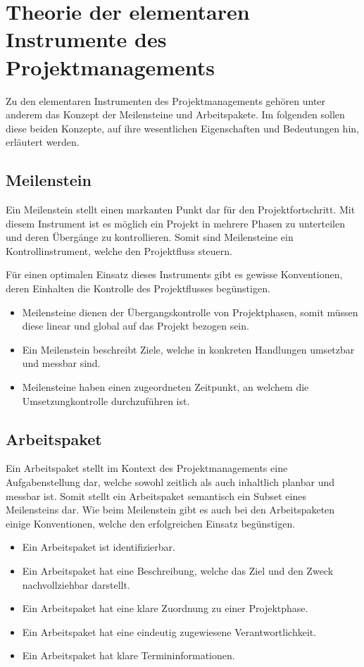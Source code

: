 \section{Theorie der elementaren Instrumente des Projektmanagements}
Zu den elementaren Instrumenten des Projektmanagements gehören unter
anderem das Konzept der Meilensteine und Arbeitspakete. Im folgenden
sollen diese beiden Konzepte, auf ihre wesentlichen Eigenschaften und
Bedeutungen hin, erläutert werden.

\subsection{Meilenstein}
Ein Meilenstein stellt einen markanten Punkt dar für den
Projektfortschritt. Mit diesem Instrument ist es möglich ein Projekt
in mehrere Phasen zu unterteilen und deren Übergänge zu kontrollieren.
Somit sind Meilensteine ein Kontrollinstrument, welche den
Projektfluss steuern.

Für einen optimalen Einsatz dieses Instruments gibt es gewisse
Konventionen, deren Einhalten die Kontrolle des Projektflusses
begünstigen.

\begin{itemize}
	\item Meilensteine dienen der Übergangskontrolle von
		Projektphasen, somit müssen diese linear und
		global auf das Projekt bezogen sein.
	\item Ein Meilenstein beschreibt Ziele, welche in konkreten
		Handlungen umsetzbar und messbar sind.
	\item Meilensteine haben einen zugeordneten Zeitpunkt, an
		welchem die Umsetzungkontrolle durchzuführen ist.
\end{itemize}

\subsection{Arbeitspaket}
Ein Arbeitspaket stellt im Kontext des Projektmanagements eine
Aufgabenstellung dar, welche sowohl zeitlich als auch inhaltlich
planbar und messbar ist. Somit stellt ein Arbeitspaket semantisch ein
Subset eines Meilensteins dar. Wie beim Meilenstein gibt es auch bei
den Arbeitspaketen einige Konventionen, welche den erfolgreichen
Einsatz begünstigen.

\begin{itemize}
	\item Ein Arbeitspaket ist identifizierbar.
	\item Ein Arbeitspaket hat eine Beschreibung, welche das Ziel
		und den Zweck nachvollziehbar darstellt.
	\item Ein Arbeitspaket hat eine klare Zuordnung zu einer
		Projektphase.
	\item Ein Arbeitspaket hat eine eindeutig zugewiesene
		Verantwortlichkeit.
	\item Ein Arbeitspaket hat klare Termininformationen.
\end{itemize}
